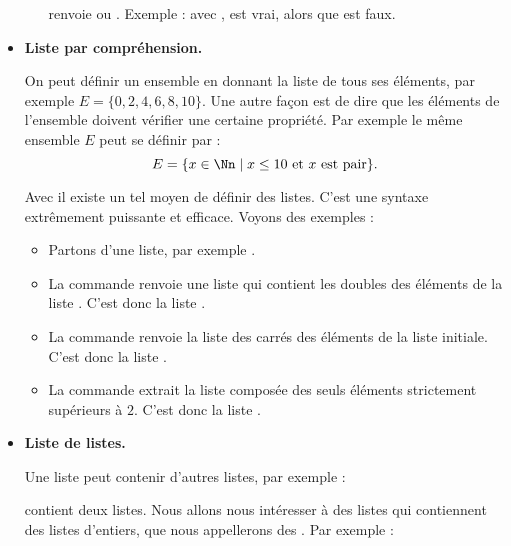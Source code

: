 \documentclass[11pt,class=report,crop=false]{standalone}
\begin{document}
\begin{cours}
\begin{itemize}
\begin{itemize}
  renvoie  ou .
  Exemple : avec ,
   \og{}\fg{} est vrai, alors que \og{}\fg{} est faux.
  
\end{itemize}
   
  \item \textbf{Liste par compréhension.}
  
  
  On peut définir un ensemble en donnant la liste de tous ses éléments, par exemple $E = \{0,2,4,6,8,10\}$. Une autre façon est de dire que les éléments de l'ensemble doivent  vérifier une certaine propriété. Par exemple le même ensemble $E$ peut se définir par :
  $$E = \{ x \in \Nn \mid x \le 10 \text{ et } x \text{ est pair} \}.$$
  
  Avec \Python{} il existe un tel moyen de définir des listes. C'est une syntaxe extrêmement puissante et efficace. Voyons des exemples :
  \begin{itemize}
    \item Partons d'une liste, par exemple .
    
    \item La commande  renvoie une liste qui contient les doubles des éléments de la liste . C'est donc la liste 
    \ci{[2,4,6,8,...]}.
    
    \item La commande  renvoie la liste des carrés des éléments de la liste initiale. C'est donc la liste \ci{[1,4,9,16,...]}.
    
    \item La commande 
    extrait la liste composée des seuls éléments strictement supérieurs à $2$. C'est donc la liste \ci{[3,4,5,6,7,6,5,4,3]}.
	\end{itemize}
	
	 
  
  \item \textbf{Liste de listes.}
  
  
  Une liste peut contenir d'autres listes, par exemple :  
  
   contient deux listes. 
  Nous allons nous intéresser à des listes qui contiennent des listes d'entiers, que nous appellerons des . Par exemple :   
  

\end{itemize}
\end{cours}
\end{document}
